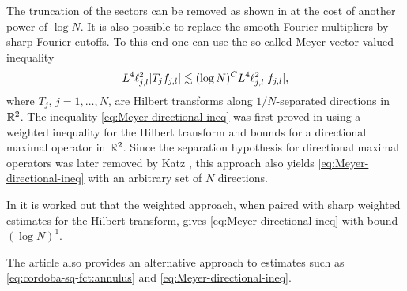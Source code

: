 \begin{remark}
The truncation of the sectors can be removed as shown in \cite{MR688026,MR730074} at the cost of another power of $\log N$.
It is also possible to replace the smooth Fourier multipliers by sharp Fourier cutoffs.
To this end one can use the so-called Meyer vector-valued inequality
\begin{equation}
\label{eq:Meyer-directional-ineq}
L^{4} \ell^{2}_{j,l} \lvert T_{j} f_{j,l}\rvert
\lesssim
(\log N)^{C} L^{4} \ell^{2}_{j,l} \lvert f_{j,l}\rvert,
\end{equation}
where $T_{j}$, $j=1,\dotsc,N$, are Hilbert transforms along $1/N$-separated directions in $\mathbb{R}^{2}$.
The inequality \eqref{eq:Meyer-directional-ineq} was first proved in \cite{MR0438022} using a weighted inequality for the Hilbert transform and bounds for a directional maximal operator in $\mathbb{R}^{2}$.
Since the separation hypothesis for directional maximal operators was later removed by Katz \cite{MR1681088}, this approach also yields \eqref{eq:Meyer-directional-ineq} with an arbitrary set of $N$ directions.

In \cite[Section 8.2]{arxiv:1902.03644} it is worked out that the weighted approach, when paired with sharp weighted estimates for the Hilbert transform, gives \eqref{eq:Meyer-directional-ineq} with bound $(\log N)^{1}$.

The article \cite{arxiv:1902.03644} also provides an alternative approach to estimates such as \eqref{eq:cordoba-sq-fct:annulus} and \eqref{eq:Meyer-directional-ineq}.
\end{remark}

